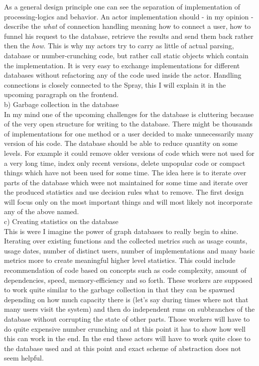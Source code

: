 \documentclass[11p]{scrartcl}
\begin{document}
As a general design principle one can see the separation of implementation of processing-logics and behavior. An actor implementation should - in my opinion - describe the \textit{what} of connection handling meaning how to connect a user, how to funnel his request to the database, retrieve the results and send them back rather then the \textit{how}. This is why my actors try to carry as little of actual parsing, database or number-crunching code, but rather call static objects which contain the implementation. It is very easy to exchange implementations for different databases without refactoring any of the code used inside the actor. Handling connections is closely connected to the Spray, this I will explain it in the upcoming paragraph on the frontend.\\

b) Garbage collection in the database\\
In my mind one of the upcoming challenges for the database is cluttering because of the very open structure for writing to the database.
There might be thousands of implementations for one method or a user decided to make unnecessarily many version of his code.
The database should be able to reduce quantity on some levels. For example it could remove older versions of code which were not used for a very long time, index only recent versions, delete unpopular code or compact things which have not been used for some time.
The idea here is to iterate over parts of the database which were not maintained for some time and iterate over the produced statistics and use decision rules what to remove. The first design will focus only on the most important things and will most likely not incorporate any of the above named.\\

c) Creating statistics on the database\\
This is were I imagine the power of graph databases to really begin to shine. Iterating over existing functions and the collected metrics such as usage counts, usage dates, number of distinct users, number of implementations and many basic metrics more to create meaningful higher level statistics. This could include recommendation of code based on concepts such as code complexity, amount of dependencies, speed, memory-efficiency and so forth. These workers are supposed to work quite similar to the garbage collection in that they can be spawned depending on how much capacity there is (let's say during times where not that many users visit the system) and then do independent runs on subbranches of the database without corrupting the state of other parts. Those workers will have to do quite expensive number crunching  and at this point it has to show how well this can work in the end. In the end these actors will have to work quite close to the database used and at this point and exact scheme of abstraction does not seem helpful.\\
\end{document}
